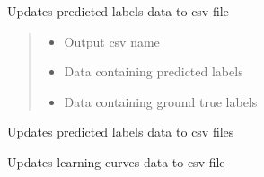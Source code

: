 \documentclass[letterpaper,10pt,english]{sphinxmanual}
\begin{document}
\begin{fulllineitems}
\begin{fulllineitems}
\label{\detokenize{net:net.UVANEMO.__update_csv_labels}}
\pysigstartsignatures
{}
\pysigstopsignatures
\sphinxAtStartPar
Updates predicted labels data to csv file
\begin{quote}\begin{description}
\begin{itemize}
\item {} 
\sphinxAtStartPar
{} \textendash{} Output csv name

\item {} 
\sphinxAtStartPar
{} \textendash{} Data containing predicted labels

\item {} 
\sphinxAtStartPar
{} \textendash{} Data containing ground true labels

\end{itemize}

\end{description}\end{quote}

\end{fulllineitems}


\begin{fulllineitems}
\label{\detokenize{net:net.UVANEMO.__update_csv_labels_data}}
\pysigstartsignatures
{}
\pysigstopsignatures
\sphinxAtStartPar
Updates predicted labels data to csv files

\end{fulllineitems}


\begin{fulllineitems}
\label{\detokenize{net:net.UVANEMO.__update_csv_lossacc_data}}
\pysigstartsignatures
{}
\pysigstopsignatures
\sphinxAtStartPar
Updates learning curves data to csv file


\end{fulllineitems}
\end{fulllineitems}
\end{document}
